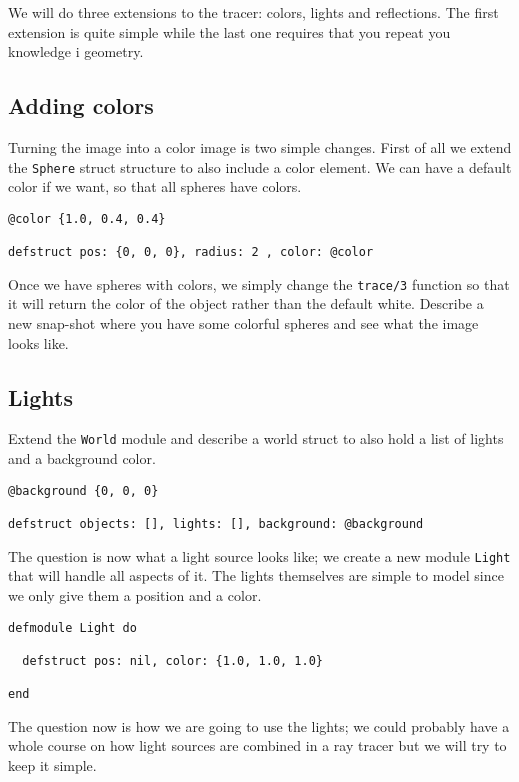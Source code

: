 \documentclass[a4paper,11pt]{article}
\begin{document}
We will do three extensions to the tracer: colors, lights and
reflections. The first extension is quite simple while the last one
requires that you repeat you knowledge i geometry. 

\subsection*{Adding colors}

Turning the image into a color image is two simple changes. First of
all we extend the {\tt Sphere} struct structure to also include a
color element. We can have a default color if we want, so that all
spheres have colors.


\begin{verbatim}
@color {1.0, 0.4, 0.4}

defstruct pos: {0, 0, 0}, radius: 2 , color: @color

\end{verbatim}

Once we have spheres with colors, we simply change the {\tt trace/3}
function so that it will return the color of the object rather than
the default white. Describe a new snap-shot where you have some
colorful spheres and see what the image looks like.

\subsection{Lights}

Extend the {\tt World} module and describe a world struct to also hold
a list of lights and a background color.

\begin{verbatim}
@background {0, 0, 0}

defstruct objects: [], lights: [], background: @background
\end{verbatim}

The question is now what a light source looks like; we create a new
module {\tt Light} that will handle all aspects of it. The lights
themselves are simple to model since we only give them a position and a
color.

\begin{verbatim}
defmodule Light do

  defstruct pos: nil, color: {1.0, 1.0, 1.0}

end
\end{verbatim}

The question now is how we are going to use the lights; we could
probably have a whole course on how light sources are combined in a
ray tracer but we will try to keep it simple. 
\end{document}
